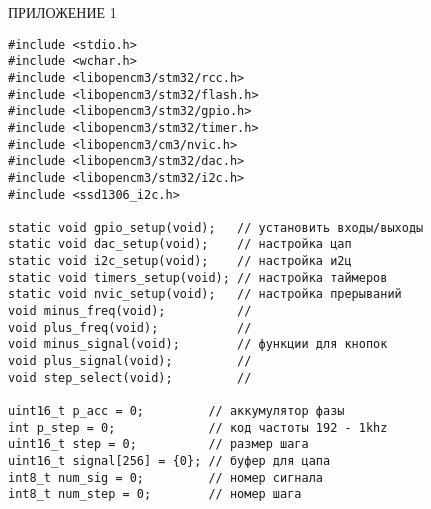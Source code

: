 \appendix
\newpage
{}
\begin{flushright}
\uppercase{Приложение 1}\label{appendix1}
\end{flushright}
\begin{code}
\begin{verbatim}
#include <stdio.h>
#include <wchar.h>
#include <libopencm3/stm32/rcc.h>
#include <libopencm3/stm32/flash.h>
#include <libopencm3/stm32/gpio.h>
#include <libopencm3/stm32/timer.h>
#include <libopencm3/cm3/nvic.h>
#include <libopencm3/stm32/dac.h>
#include <libopencm3/stm32/i2c.h>
#include <ssd1306_i2c.h>

static void gpio_setup(void);   // установить входы/выходы
static void dac_setup(void);    // настройка цап
static void i2c_setup(void);    // настройка и2ц
static void timers_setup(void); // настройка таймеров
static void nvic_setup(void);   // настройка прерываний
void minus_freq(void);          //
void plus_freq(void);           //
void minus_signal(void);        // функции для кнопок
void plus_signal(void);         //
void step_select(void);         //

uint16_t p_acc = 0;         // аккумулятор фазы
int p_step = 0;             // код частоты 192 - 1khz
uint16_t step = 0;          // размер шага
uint16_t signal[256] = {0}; // буфер для цапа
int8_t num_sig = 0;         // номер сигнала
int8_t num_step = 0;        // номер шага


\end{verbatim}
\end{code}
